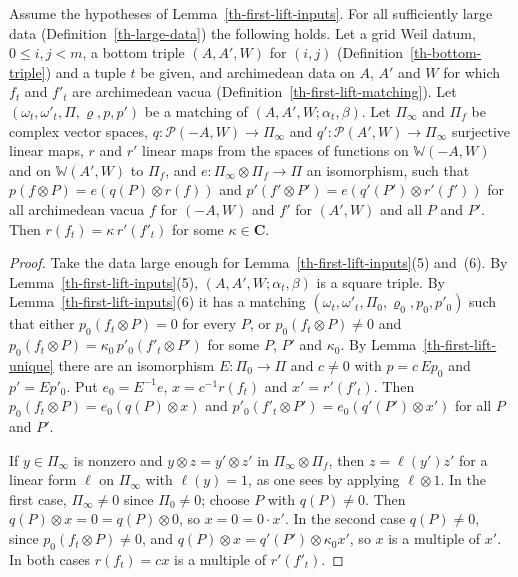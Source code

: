 \begin{lemma}\label{th-first-lift-finite}
Assume the hypotheses of Lemma~\ref{th-first-lift-inputs}. For all
sufficiently large data (Definition~\ref{th-large-data}) the following holds.
Let a grid Weil datum, $0\leq i,j<m$, a bottom triple $(A,A',W)$ for $(i,j)$
(Definition~\ref{th-bottom-triple}) and a tuple $t$ be given, and archimedean
data on $A$, $A'$ and $W$ for which $f_t$ and $f'_t$ are archimedean vacua
(Definition~\ref{th-first-lift-matching}). Let
$(\omega_t,\omega'_t,\Pi,\varrho,p,p')$ be a matching of
$(A,A',W;\alpha_t,\beta)$. Let $\Pi_\infty$ and $\Pi_f$ be complex vector
spaces, $q\colon\mathcal P(-A,W)\to\Pi_\infty$ and
$q'\colon\mathcal P(A',W)\to\Pi_\infty$ surjective linear maps, $r$ and $r'$
linear maps from the spaces of functions on $\mathbb W(-A,W)$ and on
$\mathbb W(A',W)$ to $\Pi_f$, and $e\colon\Pi_\infty\otimes\Pi_f\to\Pi$ an
isomorphism, such that $p(f\otimes P)=e(q(P)\otimes r(f))$ and
$p'(f'\otimes P')=e(q'(P')\otimes r'(f'))$ for all archimedean vacua $f$ for
$(-A,W)$ and $f'$ for $(A',W)$ and all $P$ and $P'$. Then
$r(f_t)=\kappa\,r'(f'_t)$ for some $\kappa\in\mathbf C$.
\end{lemma}
\begin{proof}
Take the data large enough for Lemma~\ref{th-first-lift-inputs}(5) and~(6).
By Lemma~\ref{th-first-lift-inputs}(5), $(A,A',W;\alpha_t,\beta)$ is a square
triple. By Lemma~\ref{th-first-lift-inputs}(6) it has a matching
$(\omega_t,\omega'_t,\Pi_0,\varrho_0,p_0,p'_0)$ such that either
$p_0(f_t\otimes P)=0$ for every $P$, or $p_0(f_t\otimes P)\neq0$ and
$p_0(f_t\otimes P)=\kappa_0\,p'_0(f'_t\otimes P')$ for some $P$, $P'$ and
$\kappa_0$. By Lemma~\ref{th-first-lift-unique} there are an isomorphism
$E\colon\Pi_0\to\Pi$ and $c\neq0$ with $p=c\,Ep_0$ and $p'=Ep'_0$. Put
$e_0=E^{-1}e$, $x=c^{-1}r(f_t)$ and $x'=r'(f'_t)$. Then
$p_0(f_t\otimes P)=e_0(q(P)\otimes x)$ and
$p'_0(f'_t\otimes P')=e_0(q'(P')\otimes x')$ for all $P$ and $P'$.

If $y\in\Pi_\infty$ is nonzero and $y\otimes z=y'\otimes z'$ in
$\Pi_\infty\otimes\Pi_f$, then $z=\ell(y')z'$ for a linear form $\ell$ on
$\Pi_\infty$ with $\ell(y)=1$, as one sees by applying $\ell\otimes1$. In the
first case, $\Pi_\infty\neq0$ since $\Pi_0\neq0$; choose $P$ with
$q(P)\neq0$. Then $q(P)\otimes x=0=q(P)\otimes0$, so $x=0=0\cdot x'$. In the
second case $q(P)\neq0$, since $p_0(f_t\otimes P)\neq0$, and
$q(P)\otimes x=q'(P')\otimes\kappa_0x'$, so $x$ is a multiple of $x'$. In both
cases $r(f_t)=cx$ is a multiple of $r'(f'_t)$.
\end{proof}

